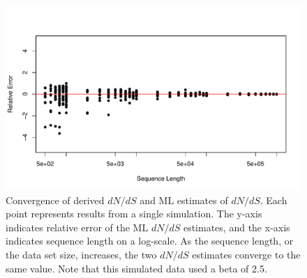 \documentclass[11pt]{article}
\begin{document}
\begin{figure}[H]
\centerline{\includegraphics[width=6in]{figures/convergence_2.5beta.pdf}}
\caption{\label{conv} Convergence of derived $dN/dS$ and ML estimates of $dN/dS$. Each point represents results from a single simulation. The y-axis indicates relative error of the ML $dN/dS$ estimates, and the x-axis indicates sequence length on a log-scale. As the sequence length, or the data set size, increases, the two $dN/dS$ estimates converge to the same value. Note that this simulated data used a beta of 2.5.}
\end{figure}


	
	
	
\end{document}

